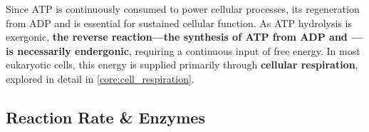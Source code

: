 \documentclass[10pt]{article}
\begin{document}
    Since ATP is continuously consumed to power cellular processes, its regeneration from ADP and  is essential for sustained cellular function. As ATP hydrolysis is exergonic, \textbf{the reverse reaction---the synthesis of ATP from ADP and ---is necessarily endergonic}, requiring a continuous input of free energy. In most eukaryotic cells, this energy is supplied primarily through \textbf{cellular respiration}, explored in detail in \autoref{core:cell_respiration}.


  \subsection{Reaction Rate \& Enzymes} %
\end{document}
